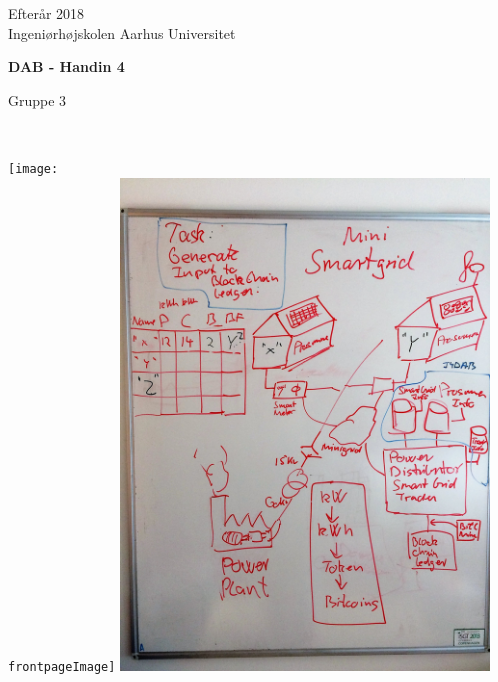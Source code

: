 \begin{center}
	{\fontsize{12pt}{0}\selectfont
		Efterår 2018\\
	}
		\vspace{5pt}
	{\fontsize{12pt}{0}\selectfont
		Ingeniørhøjskolen Aarhus Universitet\\
	}

	\vspace{25pt}
	
	{\fontsize{42pt}{0}\selectfont
		\textbf{DAB - Handin 4\\}
	}
	\vspace{5pt}
	
	{\fontsize{28pt}{0}\selectfont
		Gruppe 3\\
	}
	\vspace{25pt}
	

	{\fontsize{28pt}{0}\selectfont
        \textbf{\thetitle\\}
	}
	\vspace{20pt}

	\ifdefined\frontpageImage
		\texttt{[image: \\frontpageImage]}
	\else
		\includegraphics[width=\linewidth,height=370pt,keepaspectratio]{../../images/smartgrid.jpg}
	\fi
	\vspace*{\fill}


\end{center}
